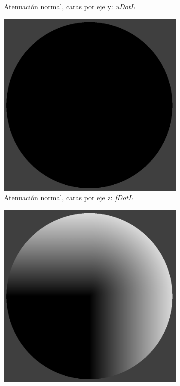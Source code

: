 \begin{figure}[H]
\begin{subfigure}[t]{0.2\textwidth}
		\caption*{Atenuación normal, caras por eje y: \emph{uDotL}}
	\end{subfigure}%
	\begin{subfigure}[t]{0.2\textwidth}
		\centering
		\captionsetup{justification=centering}
		\includegraphics[width=\linewidth]{media/nDotF.png}
		\caption*{Atenuación normal, caras por eje z: \emph{fDotL}}
	\end{subfigure}%
	\begin{subfigure}[t]{0.2\textwidth}
		\centering
		\captionsetup{justification=centering}
		\includegraphics[width=\linewidth]{media/nDotL.png}

\end{subfigure}
\end{figure}
